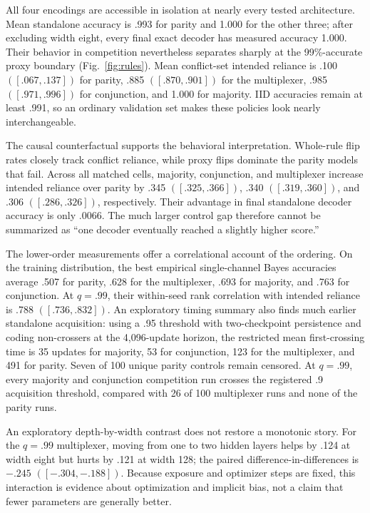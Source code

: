 \documentclass[11pt,a4paper]{article}
\newcommand{\fig}[1]{Fig.~\ref{#1}}
\begin{document}
All four encodings are accessible in isolation at nearly every tested architecture. Mean standalone accuracy is .993 for parity and 1.000 for the other three; after excluding width eight, every final exact decoder has measured accuracy 1.000. Their behavior in competition nevertheless separates sharply at the 99\%-accurate proxy boundary (\fig{fig:rules}). Mean conflict-set intended reliance is .100 $([.067,.137])$ for parity, .885 $([.870,.901])$ for the multiplexer, .985 $([.971,.996])$ for conjunction, and 1.000 for majority. IID accuracies remain at least .991, so an ordinary validation set makes these policies look nearly interchangeable.

The causal counterfactual supports the behavioral interpretation. Whole-rule flip rates closely track conflict reliance, while proxy flips dominate the parity models that fail. Across all matched cells, majority, conjunction, and multiplexer increase intended reliance over parity by .345 $([.325,.366])$, .340 $([.319,.360])$, and .306 $([.286,.326])$, respectively. Their advantage in final standalone decoder accuracy is only .0066. The much larger control gap therefore cannot be summarized as ``one decoder eventually reached a slightly higher score.''

The lower-order measurements offer a correlational account of the ordering. On the training distribution, the best empirical single-channel Bayes accuracies average .507 for parity, .628 for the multiplexer, .693 for majority, and .763 for conjunction. At $q=.99$, their within-seed rank correlation with intended reliance is .788 $([.736,.832])$. An exploratory timing summary also finds much earlier standalone acquisition: using a .95 threshold with two-checkpoint persistence and coding non-crossers at the 4,096-update horizon, the restricted mean first-crossing time is 35 updates for majority, 53 for conjunction, 123 for the multiplexer, and 491 for parity. Seven of 100 unique parity controls remain censored. At $q=.99$, every majority and conjunction competition run crosses the registered .9 acquisition threshold, compared with 26 of 100 multiplexer runs and none of the parity runs.

An exploratory depth-by-width contrast does not restore a monotonic story. For the $q=.99$ multiplexer, moving from one to two hidden layers helps by .124 at width eight but hurts by .121 at width 128; the paired difference-in-differences is $-.245$ $([-.304,-.188])$. Because exposure and optimizer steps are fixed, this interaction is evidence about optimization and implicit bias, not a claim that fewer parameters are generally better.
\end{document}
